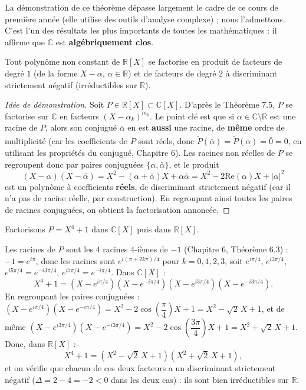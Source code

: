 \documentclass[a4paper,12pt,openany]{book}
\begin{document}
\begin{remarque}
La démonstration de ce théorème dépasse largement le cadre de ce cours de
première année (elle utilise des outils d'analyse complexe) ; nous
l'admettons. C'est l'un des résultats les plus importants de toutes les
mathématiques : il affirme que $\mathbb{C}$ est \textbf{algébriquement
clos}.
\end{remarque}

\begin{theoreme}
Tout polynôme non constant de $\mathbb{R}[X]$ se factorise en produit de
facteurs de degré $1$ (de la forme $X-\alpha$, $\alpha\in\mathbb{R}$) et
de facteurs de degré $2$ à discriminant strictement négatif (irréductibles
sur $\mathbb{R}$).
\end{theoreme}

\begin{proof}[Idée de démonstration]
Soit $P\in\mathbb{R}[X]\subset\mathbb{C}[X]$. D'après le Théorème 7.5,
$P$ se factorise sur $\mathbb{C}$ en facteurs $(X-\alpha_k)^{m_k}$. Le
point clé est que si $\alpha\in\mathbb{C}\setminus\mathbb{R}$ est une
racine de $P$, alors son conjugué $\bar\alpha$ en est \textbf{aussi} une
racine, de \textbf{même} ordre de multiplicité (car les coefficients de
$P$ sont réels, donc $\widetilde P(\bar\alpha) =
\overline{\widetilde P(\alpha)} = \bar 0 = 0$, en utilisant les propriétés
du conjugué, Chapitre 6). Les racines non réelles de $P$ se regroupent
donc par paires conjuguées $\{\alpha,\bar\alpha\}$, et le produit
\[
(X-\alpha)(X-\bar\alpha) = X^2 - (\alpha+\bar\alpha)X + \alpha\bar\alpha =
X^2 - 2\mathrm{Re}(\alpha)X + |\alpha|^2
\]
est un polynôme à coefficients \textbf{réels}, de discriminant
strictement négatif (car il n'a pas de racine réelle, par construction).
En regroupant ainsi toutes les paires de racines conjuguées, on obtient
la factorisation annoncée.
\end{proof}

\begin{exemple}[7.4]
Factorisons $P=X^4+1$ dans $\mathbb{C}[X]$ puis dans $\mathbb{R}[X]$.

Les racines de $P$ sont les $4$ racines $4$-ièmes de $-1$ (Chapitre 6,
Théorème 6.3) : $-1=e^{i\pi}$, donc les racines sont
$e^{i(\pi+2k\pi)/4}$ pour $k=0,1,2,3$, soit $e^{i\pi/4}$, $e^{i3\pi/4}$,
$e^{i5\pi/4}=e^{-i3\pi/4}$, $e^{i7\pi/4}=e^{-i\pi/4}$. Dans
$\mathbb{C}[X]$ :
\[
X^4+1 = \left(X-e^{i\pi/4}\right)\left(X-e^{-i\pi/4}\right)
\left(X-e^{i3\pi/4}\right)\left(X-e^{-i3\pi/4}\right).
\]
En regroupant les paires conjuguées : $\left(X-e^{i\pi/4}\right)
\left(X-e^{-i\pi/4}\right) = X^2 - 2\cos\!\left(\dfrac{\pi}{4}\right)X+1
= X^2-\sqrt2\,X+1$, et de même
$\left(X-e^{i3\pi/4}\right)\left(X-e^{-i3\pi/4}\right) =
X^2-2\cos\!\left(\dfrac{3\pi}{4}\right)X+1 = X^2+\sqrt2\,X+1$. Donc, dans
$\mathbb{R}[X]$ :
\[
X^4+1 = (X^2-\sqrt2\,X+1)(X^2+\sqrt2\,X+1),
\]
et on vérifie que chacun de ces deux facteurs a un discriminant
strictement négatif ($\Delta = 2-4=-2<0$ dans les deux cas) : ils sont
bien irréductibles sur $\mathbb{R}$.
\end{exemple}
\end{document}
